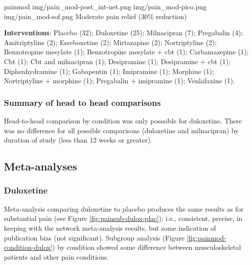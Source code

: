 \documentclass{report}\usepackage[]{graphicx}\usepackage[]{color}
\begin{document}
\soffignew
{painmod}
{img/pain_mod-post_int-net.png}
{img/pain_mod-pico.png}
{img/pain_mod-sof.png}
{Moderate pain relief (30\% reduction)}

\textbf{Interventions}: Placebo (32); Duloxetine (25); Milnacipran (7); Pregabalin (4); Amitriptyline (2); Esreboxetine (2); Mirtazapine (2); Nortriptyline (2); Benzotropine mesylate (1); Benzotropine mesylate + cbt (1); Carbamazepine (1); Cbt (1); Cbt and milnacipran (1); Desipramine (1); Desipramine + cbt (1); Diphenhydramine (1); Gabapentin (1); Imipramine (1); Morphine (1); Nortriptyline + morphine (1); Pregabalin + imipramine (1); Venlafaxine (1).

\subsubsection{Summary of head to head comparisons}

Head-to-head comparison by condition was only posssible for duloxetine. There was no difference for all possible comparisons (duloxetine and milnacipran) by duration of study (less than 12 weeks or greater).

\subsection{Meta-analyses}

\subsubsection{Duloxetine}

Meta-analysis comparing duloxetine to placebo produces the same results as for substantial pain (see Figure \ref{fig:painsub-dulox-plac}); i.e., consistent, precise, in keeping with the network meta-analysis results, but some indication of publication bias (not significant). Subgroup analysis (Figure \ref{fig:painmod-condition-dulox}) by condition showed some difference between musculoskeletal patients and other pain conditions.
\end{document}
